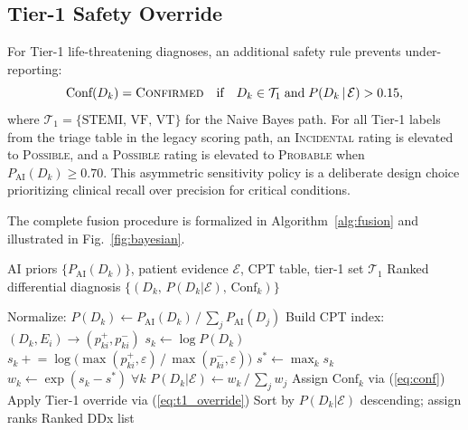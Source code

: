 \documentclass[journal]{IEEEtran}
\begin{document}
\subsection{Tier-1 Safety Override}

For Tier-1 life-threatening diagnoses, an additional safety rule
prevents under-reporting:
\begin{equation}
  \text{Conf}(D_k) = \textsc{Confirmed}
  \quad \text{if} \quad D_k \in \mathcal{T}_1
  \;\text{and}\; P(D_k \,|\, \mathcal{E}) > 0.15,
  \label{eq:t1_override}
\end{equation}
where $\mathcal{T}_1 = \{\text{STEMI},\, \text{VF},\, \text{VT}\}$
for the Naive Bayes path.
For all Tier-1 labels from the triage table in the legacy scoring
path, an \textsc{Incidental} rating is elevated to \textsc{Possible},
and a \textsc{Possible} rating is elevated to \textsc{Probable} when
$P_{\text{AI}}(D_k) \geq 0.70$.
This asymmetric sensitivity policy is a deliberate design choice
prioritizing clinical recall over precision for critical conditions.

The complete fusion procedure is formalized in
Algorithm~\ref{alg:fusion} and illustrated in
Fig.~\ref{fig:bayesian}.

\begin{algorithm}[t]
\caption{ECGenius Naive Bayesian Decision Fusion}
\label{alg:fusion}
\begin{algorithmic}[1]
  \REQUIRE AI priors $\{P_{\text{AI}}(D_k)\}$, patient evidence
           $\mathcal{E}$, CPT table, tier-1 set $\mathcal{T}_1$
  \ENSURE  Ranked differential diagnosis $\{(D_k,\,
           P(D_k|\mathcal{E}),\, \text{Conf}_k)\}$

  \STATE Normalize: $P(D_k) \leftarrow P_{\text{AI}}(D_k)
         \,/\, \sum_j P_{\text{AI}}(D_j)$
  \STATE Build CPT index: $(D_k, E_i) \to (p^+_{ki}, p^-_{ki})$
    \STATE $s_k \leftarrow \log P(D_k)$
        \STATE $s_k \mathrel{+}= \log\!\big(
               \max(p^+_{ki}, \varepsilon) \,/\,
               \max(p^-_{ki}, \varepsilon)\big)$
      \ENDIF
    \ENDFOR
  \ENDFOR
  \STATE $s^* \leftarrow \max_k s_k$
  \STATE $w_k \leftarrow \exp(s_k - s^*)\; \forall k$
  \STATE $P(D_k|\mathcal{E}) \leftarrow w_k \,/\, \sum_j w_j$
  \STATE Assign $\text{Conf}_k$ via (\ref{eq:conf})
  \STATE Apply Tier-1 override via (\ref{eq:t1_override})
  \STATE Sort by $P(D_k|\mathcal{E})$ descending; assign ranks
  \RETURN Ranked DDx list
\end{algorithmic}
\end{algorithm}
\end{document}
